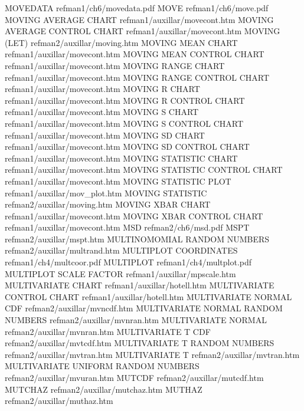 MOVEDATA                                refman1/ch6/movedata.pdf
MOVE                                    refman1/ch6/move.pdf
MOVING AVERAGE CHART                    refman1/auxillar/movecont.htm
MOVING AVERAGE CONTROL CHART            refman1/auxillar/movecont.htm
MOVING (LET)                            refman2/auxillar/moving.htm
MOVING MEAN CHART                       refman1/auxillar/movecont.htm
MOVING MEAN CONTROL CHART               refman1/auxillar/movecont.htm
MOVING RANGE CHART                      refman1/auxillar/movecont.htm
MOVING RANGE CONTROL CHART              refman1/auxillar/movecont.htm
MOVING R CHART                          refman1/auxillar/movecont.htm
MOVING R CONTROL CHART                  refman1/auxillar/movecont.htm
MOVING S CHART                          refman1/auxillar/movecont.htm
MOVING S CONTROL CHART                  refman1/auxillar/movecont.htm
MOVING SD CHART                         refman1/auxillar/movecont.htm
MOVING SD CONTROL CHART                 refman1/auxillar/movecont.htm
MOVING STATISTIC CHART                  refman1/auxillar/movecont.htm
MOVING STATISTIC CONTROL CHART          refman1/auxillar/movecont.htm
MOVING STATISTIC PLOT                   refman1/auxillar/mov_plot.htm
MOVING STATISTIC                        refman2/auxillar/moving.htm
MOVING XBAR CHART                       refman1/auxillar/movecont.htm
MOVING XBAR CONTROL CHART               refman1/auxillar/movecont.htm
MSD                                     refman2/ch6/msd.pdf
MSPT                                    refman2/auxillar/mspt.htm
MULTINOMOMIAL RANDOM NUMBERS            refman2/auxillar/multrand.htm
MULTIPLOT COORDINATES                   refman1/ch4/multcoor.pdf
MULTIPLOT                               refman1/ch4/multplot.pdf
MULTIPLOT SCALE FACTOR                  refman1/auxillar/mpscale.htm
MULTIVARIATE CHART                      refman1/auxillar/hotell.htm
MULTIVARIATE CONTROL CHART              refman1/auxillar/hotell.htm
MULTIVARIATE NORMAL CDF                 refman2/auxillar/mvncdf.htm
MULTIVARIATE NORMAL RANDOM NUMBERS      refman2/auxillar/mvnran.htm
MULTIVARIATE NORMAL                     refman2/auxillar/mvnran.htm
MULTIVARIATE T CDF                      refman2/auxillar/mvtcdf.htm
MULTIVARIATE T RANDOM NUMBERS           refman2/auxillar/mvtran.htm
MULTIVARIATE T                          refman2/auxillar/mvtran.htm
MULTIVARIATE UNIFORM RANDOM NUMBERS     refman2/auxillar/mvuran.htm
MUTCDF                                  refman2/auxillar/mutcdf.htm
MUTCHAZ                                 refman2/auxillar/mutchaz.htm
MUTHAZ                                  refman2/auxillar/muthaz.htm
